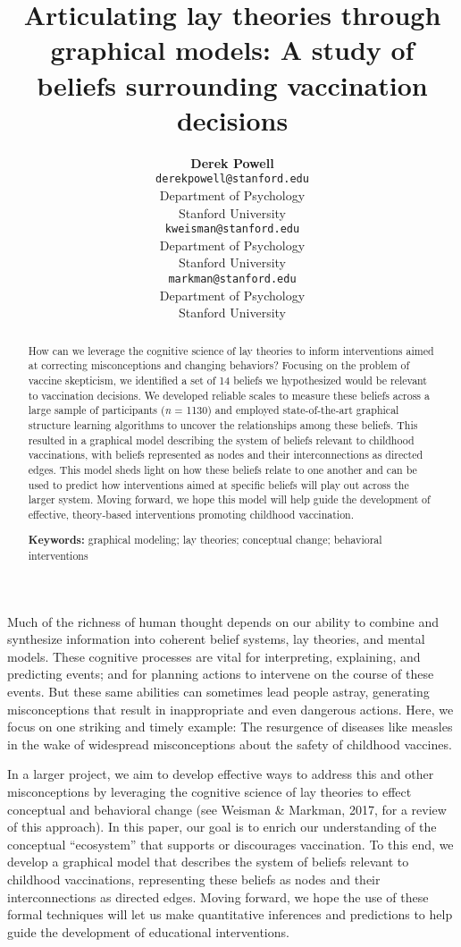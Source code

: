 \documentclass[10pt, letterpaper]{article}
\title{Articulating lay theories through graphical models: A study of beliefs
surrounding vaccination decisions}
\author{{\large \bf Derek Powell} \\ \texttt{derekpowell@stanford.edu} \\ Department of Psychology \\ Stanford University \And {\large \bf Kara Weisman} \\ \texttt{kweisman@stanford.edu} \\ Department of Psychology \\ Stanford University \And {\large \bf Ellen M. Markman} \\ \texttt{markman@stanford.edu} \\ Department of Psychology \\ Stanford University}
\begin{document}
\maketitle

\begin{abstract}
How can we leverage the cognitive science of lay theories to inform
interventions aimed at correcting misconceptions and changing behaviors?
Focusing on the problem of vaccine skepticism, we identified a set of 14
beliefs we hypothesized would be relevant to vaccination decisions. We
developed reliable scales to measure these beliefs across a large sample
of participants (\emph{n} = 1130) and employed state-of-the-art
graphical structure learning algorithms to uncover the relationships
among these beliefs. This resulted in a graphical model describing the
system of beliefs relevant to childhood vaccinations, with beliefs
represented as nodes and their interconnections as directed edges. This
model sheds light on how these beliefs relate to one another and can be
used to predict how interventions aimed at specific beliefs will play
out across the larger system. Moving forward, we hope this model will
help guide the development of effective, theory-based interventions
promoting childhood vaccination.

\textbf{Keywords:}
graphical modeling; lay theories; conceptual change; behavioral
interventions
\end{abstract}

Much of the richness of human thought depends on our ability to combine
and synthesize information into coherent belief systems, lay theories,
and mental models. These cognitive processes are vital for interpreting,
explaining, and predicting events; and for planning actions to intervene
on the course of these events. But these same abilities can sometimes
lead people astray, generating misconceptions that result in
inappropriate and even dangerous actions. Here, we focus on one striking
and timely example: The resurgence of diseases like measles in the wake
of widespread misconceptions about the safety of childhood vaccines.

In a larger project, we aim to develop effective ways to address this
and other misconceptions by leveraging the cognitive science of lay
theories to effect conceptual and behavioral change (see Weisman \&
Markman, 2017, for a review of this approach). In this paper, our goal
is to enrich our understanding of the conceptual ``ecosystem'' that
supports or discourages vaccination. To this end, we develop a graphical
model that describes the system of beliefs relevant to childhood
vaccinations, representing these beliefs as nodes and their
interconnections as directed edges. Moving forward, we hope the use of
these formal techniques will let us make quantitative inferences and
predictions to help guide the development of educational interventions.
\end{document}

